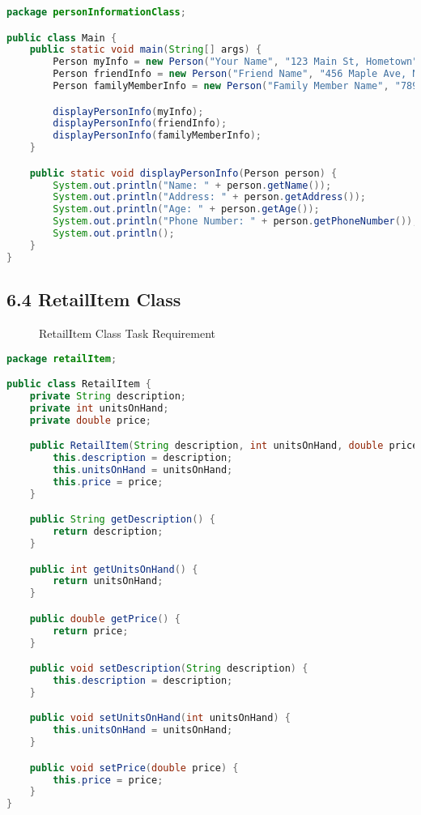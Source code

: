 \documentclass{article}
\begin{document}
\begin{lstlisting}[language=Java, caption=Main.java]
package personInformationClass;

public class Main {
    public static void main(String[] args) {
        Person myInfo = new Person("Your Name", "123 Main St, Hometown", 30, "555-1234");
        Person friendInfo = new Person("Friend Name", "456 Maple Ave, Nearby Town", 25, "555-5678");
        Person familyMemberInfo = new Person("Family Member Name", "789 Oak Dr, Family Town", 55, "555-8765");

        displayPersonInfo(myInfo);
        displayPersonInfo(friendInfo);
        displayPersonInfo(familyMemberInfo);
    }

    public static void displayPersonInfo(Person person) {
        System.out.println("Name: " + person.getName());
        System.out.println("Address: " + person.getAddress());
        System.out.println("Age: " + person.getAge());
        System.out.println("Phone Number: " + person.getPhoneNumber());
        System.out.println();
    }
}

\end{lstlisting}

\subsection*{6.4 RetailItem Class}

\begin{figure}[h]
    \centering
    \caption{RetailItem Class Task Requirement}
\end{figure}

\begin{lstlisting}[language=Java, caption=RetailItem.java]
package retailItem;

public class RetailItem {
    private String description;
    private int unitsOnHand;
    private double price;

    public RetailItem(String description, int unitsOnHand, double price) {
        this.description = description;
        this.unitsOnHand = unitsOnHand;
        this.price = price;
    }

    public String getDescription() {
        return description;
    }

    public int getUnitsOnHand() {
        return unitsOnHand;
    }

    public double getPrice() {
        return price;
    }

    public void setDescription(String description) {
        this.description = description;
    }

    public void setUnitsOnHand(int unitsOnHand) {
        this.unitsOnHand = unitsOnHand;
    }

    public void setPrice(double price) {
        this.price = price;
    }
}

\end{lstlisting}
\end{document}
